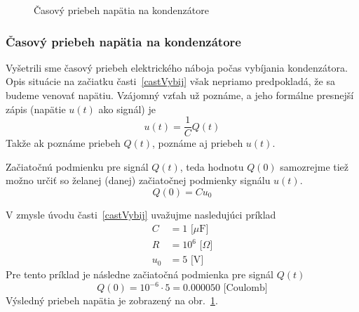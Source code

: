 \documentclass[a4paper, 10pt, ]{article}
\begin{document}
\begin{figure}[!b]
	\centering


	\caption{Časový priebeh napätia na kondenzátore}
	\label{PriebehNapatieDefault}
\end{figure}







\subsubsection{Časový priebeh napätia na kondenzátore}


Vyšetrili sme časový priebeh elektrického náboja počas vybíjania kondenzátora. Opis situácie na začiatku časti~\ref{castVybij} však nepriamo predpokladá, že sa budeme venovať napätiu. Vzájomný vzťah už poznáme, a jeho formálne presnejší zápis (napätie $u(t)$ ako signál) je
\begin{equation} \label{QUsig}
    u(t) = \frac{1}{C} Q(t)
\end{equation}
Takže ak poznáme priebeh $Q(t)$, poznáme aj priebeh $u(t)$.

Začiatočnú podmienku pre signál $Q(t)$, teda hodnotu $Q(0)$ samozrejme tiež možno určiť so želanej (danej) začiatočnej podmienky signálu $u(t)$.
\begin{equation}
    Q(0) = C u_0
\end{equation}





\bigskip

\noindent
V zmysle úvodu časti~\ref{castVybij} uvažujme nasledujúci príklad
\begin{align*}
    C &= 1 \text{ [$\mu$F]} \\
    R &= 10^6  \text{ [$\Omega$]} \\
    u_0 &= 5  \text{ [V]}
\end{align*}
Pre tento príklad je následne začiatočná podmienka pre signál $Q(t)$
\begin{equation}
    Q(0) = 10^{-6} \cdot 5 = 0.000050 \text{ [Coulomb]}
\end{equation}
Výsledný priebeh napätia je zobrazený na obr.~\ref{PriebehNapatieDefault}.
\end{document}
